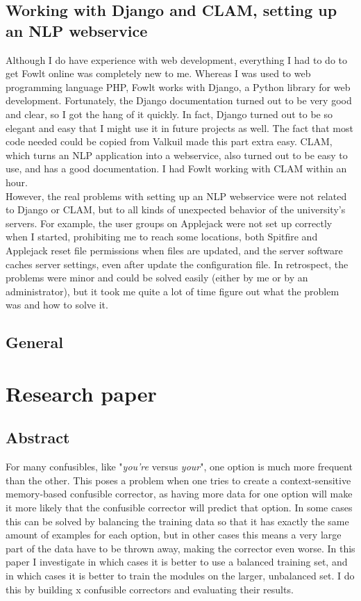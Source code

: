 \documentclass[12pt]{article}
\let\stdsection\section
\renewcommand\section{\newpage\stdsection}
\begin{document}
\subsection{Working with Django and CLAM, setting up an NLP webservice}
Although I do have experience with web development, everything I had to do to get Fowlt online was completely new to me. Whereas I was used to web programming language PHP, Fowlt works with Django, a Python library for web development. Fortunately, the Django documentation turned out to be very good and clear, so I got the hang of it quickly. In fact, Django turned out to be so elegant and easy that I might use it in future projects as well. The fact that most code needed could be copied from Valkuil made this part extra easy. CLAM, which turns an NLP application into a webservice, also turned out to be easy to use, and has a good documentation. I had Fowlt working with CLAM within an hour.
\\\indent
However, the real problems with setting up an NLP webservice were not related to Django or CLAM, but to all kinds of unexpected behavior of the university's servers. For example, the user groups on Applejack were not set up correctly when I started, prohibiting me to reach some locations, both Spitfire and Applejack reset file permissions when files are updated, and the server software caches server settings, even after update the configuration file. In retrospect, the problems were minor and could be solved easily (either by me or by an administrator), but it took me quite a lot of time figure out what the problem was and how to solve it.

\subsection{General}


\section{Research paper}

\subsection*{Abstract}

For many confusibles, like "\emph{you're} versus \emph{your}", one option is much more frequent than the other. This poses a problem when one tries to create a context-sensitive memory-based confusible corrector, as having more data for one option will make it more likely that the confusible corrector will predict that option. In some cases this can be solved by balancing the training data so that it has exactly the same amount of examples for each option, but in other cases this means a very large part of the data have to be thrown away, making the corrector even worse. In this paper I investigate in which cases it is better to use a balanced training set, and in which cases it is better to train the modules on the larger, unbalanced set. I do this by building x confusible correctors and evaluating their results.
\end{document}
